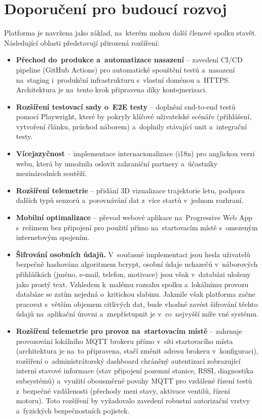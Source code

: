 \section{Doporučení pro budoucí rozvoj}

Platforma je navržena jako základ, na~kterém mohou další členové spolku stavět. Následující oblasti představují přirozená rozšíření:

\begin{sloppypar}
\begin{itemize}
    \item \textbf{Přechod do~produkce a~automatizace nasazení} -- zavedení CI/CD pipeline (GitHub Actions) pro automatické spouštění testů a~nasazení na~staging i~produkční infrastrukturu s~vlastní doménou a~HTTPS. Architektura je na~tento krok připravena díky kontejnerizaci.
    \item \textbf{Rozšíření testovací sady o~E2E testy} -- doplnění end-to-end testů pomocí Playwright, které by pokryly klíčové uživatelské scénáře (přihlášení, vytvoření článku, průchod náborem) a~doplnily stávající unit a~integrační testy.
    \item \textbf{Vícejazyčnost} -- implementace internacionalizace (i18n) pro anglickou verzi webu, která by umožnila oslovit zahraniční partnery a~účastníky mezinárodních soutěží.
    \item \textbf{Rozšíření telemetrie} -- přidání 3D vizualizace trajektorie letu, podpora dalších typů senzorů a~porovnávání dat z~více startů v~jednom rozhraní.
    \item \textbf{Mobilní optimalizace} -- převod webové aplikace na~Progressive Web App s~režimem bez připojení pro použití přímo na~startovacím místě s~omezeným internetovým spojením.
    \item \textbf{Šifrování osobních údajů.} V~současné implementaci jsou hesla uživatelů bezpečně hashována algoritmem bcrypt, osobní údaje uchazečů v~náborových přihláškách (jméno, e-mail, telefon, motivace) jsou však v~databázi uloženy jako prostý text. Vzhledem k~malému rozsahu spolku a~lokálnímu provozu databáze se zatím nejedná o~kritickou slabinu. Jakmile však platforma začne pracovat s~větším objemem citlivých dat, bude vhodné zavést šifrování těchto údajů na~aplikační úrovni a~znepřístupnit je v~co~nejvyšší míře vně systému.
    \item \textbf{Rozšíření telemetrie pro provoz na~startovacím místě} -- zahrnuje provozování lokálního MQTT brokeru přímo v~síti startovacího místa (architektura je na~to připravena, stačí změnit adresu brokeru v~konfiguraci), rozšíření o~administrátorský dashboard chráněný autentizací zobrazující interní stavové informace (stav připojení pozemní stanice, RSSI, diagnostika subsystémů) a~využití obousměrné povahy MQTT pro vzdálené řízení testů z~bezpečné vzdálenosti (přechody mezi stavy, aktivace ventilů, řízení motoru). Toto rozšíření by vyžadovalo zavedení robustní autorizační vrstvy a~fyzických bezpečnostních pojistek.

\end{itemize}
\end{sloppypar}
